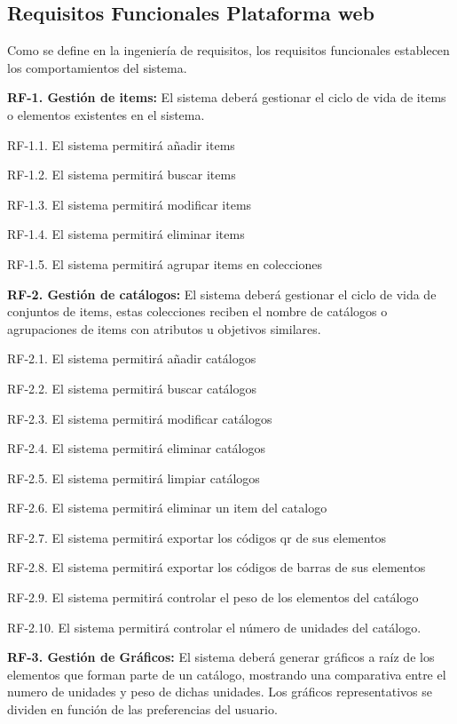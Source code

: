 \documentclass[a4paper,11pt]{book}
\begin{document}
\subsection{Requisitos Funcionales Plataforma web}

Como se define en la ingeniería de requisitos, los requisitos funcionales establecen los comportamientos del sistema.

\textbf{RF-1. Gestión de items:} El sistema deberá gestionar el ciclo de vida de items o elementos existentes en el sistema.
   

	RF-1.1. El sistema permitirá añadir items

	RF-1.2. El sistema permitirá buscar items

	RF-1.3. El sistema permitirá modificar items

	RF-1.4. El sistema permitirá eliminar items

	RF-1.5. El sistema permitirá agrupar items en colecciones


\textbf{RF-2. Gestión de catálogos:} El sistema deberá gestionar el ciclo de vida de conjuntos de items, estas colecciones reciben el nombre de catálogos o agrupaciones de items con atributos u objetivos similares.   


	RF-2.1. El sistema permitirá añadir catálogos

	RF-2.2. El sistema permitirá buscar catálogos

	RF-2.3. El sistema permitirá modificar catálogos

	RF-2.4. El sistema permitirá eliminar catálogos

	RF-2.5. El sistema permitirá limpiar catálogos

	RF-2.6. El sistema permitirá eliminar un item del catalogo

	RF-2.7. El sistema permitirá exportar los códigos qr de sus elementos

	RF-2.8. El sistema permitirá exportar los códigos de barras de sus elementos

	RF-2.9. El sistema permitirá controlar el peso de los elementos del catálogo

	RF-2.10. El sistema permitirá controlar el número de unidades del catálogo. 
	

\textbf{RF-3. Gestión de Gráficos:} El sistema deberá generar gráficos a raíz de los elementos que forman parte de un catálogo, mostrando una comparativa entre el numero de unidades y peso de dichas unidades. Los gráficos representativos se dividen en función de las preferencias del usuario. 
\end{document}
